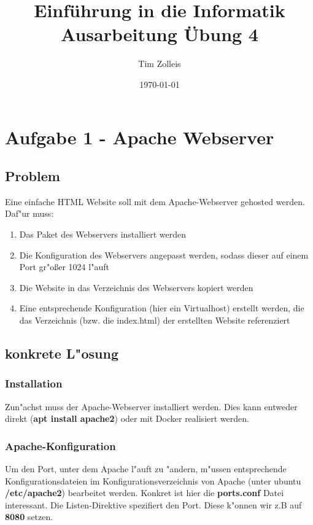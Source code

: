 \documentclass[a4paper,11pt,titlepage]{article}
\begin{document}
    \title{Einf\"uhrung in die Informatik\\
    Ausarbeitung \"Ubung 4}


    \author{Tim Zolleis}

    \date{\today}

    \maketitle{\thispagestyle{plain}}


    \section{Aufgabe 1 - Apache Webserver}

    \subsection{Problem}
    Eine einfache HTML Website soll mit dem Apache-Webserver gehosted werden. Daf"ur muss:
    \begin{enumerate}
        \item Das Paket des Webservers installiert werden
        \item Die Konfiguration des Webservers angepasst werden, sodass dieser auf einem Port gr"oßer 1024 l"auft
        \item Die Website in das Verzeichnis des Webservers kopiert werden
        \item Eine entsprechende Konfiguration (hier ein Virtualhost) erstellt werden, die das Verzeichnis (bzw. die index.html) der erstellten Website referenziert
    \end{enumerate}

    \subsection{konkrete L"osung}

    \subsubsection{Installation}
    Zun"achst muss der Apache-Webserver installiert werden. Dies kann entweder direkt (\textbf{apt install apache2}) oder mit Docker realisiert werden.

    \subsubsection{Apache-Konfiguration}
    Um den Port, unter dem Apache l"auft zu "andern, m"ussen entsprechende Konfigurationsdateien im Konfigurationsverzeichnis von Apache (unter ubuntu \textbf{/etc/apache2}) bearbeitet werden.
    Konkret ist hier die \textbf{ports.conf} Datei interessant. Die Listen-Direktive spezifiert den Port. Diese k"onnen wir z.B auf \textbf{8080} setzen.
\end{document}
